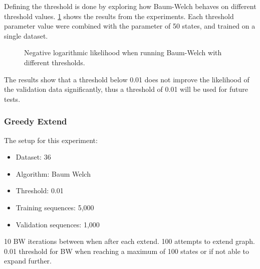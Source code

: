 Defining the threshold is done by exploring how Baum-Welch behaves on different threshold values. \ref{fig:threshold} shows the results from the experiments. Each threshold parameter value were combined with the parameter of 50 states, and trained on a single dataset.

\begin{figure}
\centering
\caption{Negative logarithmic likelihood when running Baum-Welch with different thresholds.}
\label{fig:threshold}
\end{figure}

The results show that a threshold below 0.01 does not improve the likelihood of the validation data significantly, thus a threshold of 0.01 will be used for future tests.

\subsubsection{Greedy Extend}

The setup for this experiment:
\begin{itemize}
\item Dataset: 36
\item Algorithm: Baum Welch
\item Threshold: 0.01
\item Training sequences: 5,000
\item Validation sequences: 1,000
\end{itemize}

10 BW iterations between when after each extend.
100 attempts to extend graph.
0.01 threshold for BW when reaching a maximum of 100 states or if not able to expand further.

